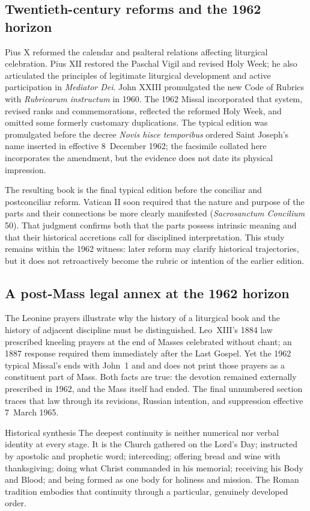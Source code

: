 \subsection{Twentieth-century reforms and the 1962 horizon}

Pius X reformed the calendar and psalteral relations affecting liturgical celebration. Pius XII restored the Paschal Vigil and revised Holy Week; he also articulated the principles of legitimate liturgical development and active participation in \emph{Mediator Dei}. John XXIII promulgated the new Code of Rubrics with \emph{Rubricarum instructum} in 1960. The 1962 Missal incorporated that system, revised ranks and commemorations, reflected the reformed Holy Week, and omitted some formerly customary duplications. The typical edition was promulgated before the decree \emph{Novis hisce temporibus} ordered Saint Joseph's name inserted in  effective 8~December 1962; the facsimile collated here incorporates the amendment, but the evidence does not date its physical impression.

The resulting book is the final typical edition before the conciliar and postconciliar reform. Vatican II soon required that the nature and purpose of the parts and their connections be more clearly manifested (\emph{Sacrosanctum Concilium} 50). That judgment confirms both that the parts possess intrinsic meaning and that their historical accretions call for disciplined interpretation. This study remains within the 1962 witness: later reform may clarify historical trajectories, but it does not retroactively become the rubric or intention of the earlier edition.

\subsection{A post-Mass legal annex at the 1962 horizon}

The Leonine prayers illustrate why the history of a liturgical book and the history of adjacent discipline must be distinguished. Leo~XIII's 1884 law prescribed kneeling prayers at the end of Masses celebrated without chant; an 1887 response required them immediately after the Last Gospel. Yet the 1962 typical Missal's  ends with John~1 and  and does not print those prayers as a constituent part of Mass. Both facts are true: the devotion remained externally prescribed in 1962, and the Mass itself had ended. The final unnumbered section traces that law through its revisions, Russian intention, and suppression effective 7~March 1965.

\begin{studybox}{Historical synthesis}
The deepest continuity is neither numerical nor verbal identity at every stage. It is the Church gathered on the Lord's Day; instructed by apostolic and prophetic word; interceding; offering bread and wine with thanksgiving; doing what Christ commanded in his memorial; receiving his Body and Blood; and being formed as one body for holiness and mission. The Roman tradition embodies that continuity through a particular, genuinely developed order.
\end{studybox}
